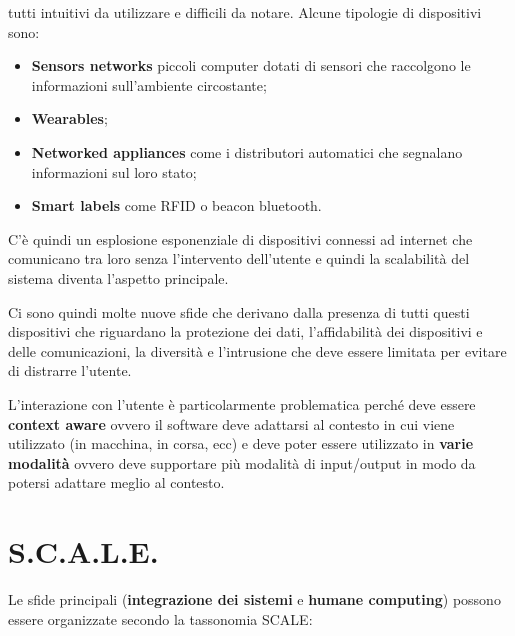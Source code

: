 tutti intuitivi da utilizzare e difficili da notare.
Alcune tipologie di dispositivi sono:

\begin{itemize}
\item \textbf{Sensors networks} piccoli computer dotati di sensori che
  raccolgono le informazioni sull'ambiente circostante;
\item \textbf{Wearables};
\item \textbf{Networked appliances} come i distributori automatici che
  segnalano informazioni sul loro stato;
\item \textbf{Smart labels} come RFID o beacon bluetooth.

\end{itemize}

C'è quindi un esplosione esponenziale di dispositivi connessi ad
internet che comunicano tra loro senza l'intervento dell'utente e
quindi la scalabilità del sistema diventa l'aspetto principale.

Ci sono quindi molte nuove sfide che derivano dalla presenza di tutti
questi dispositivi che riguardano la protezione dei dati, l'affidabilità
dei dispositivi e delle comunicazioni, la diversità e l'intrusione che
deve essere limitata per evitare di distrarre l'utente.

L'interazione con l'utente è particolarmente problematica perché deve
essere \textbf{context aware} ovvero il software deve adattarsi al
contesto in cui viene utilizzato (in macchina, in corsa, ecc) e deve
poter essere utilizzato in \textbf{varie modalità} ovvero deve
supportare più modalità di input/output in modo da potersi adattare
meglio al contesto.

\section{S.C.A.L.E.}
\label{s.c.a.l.e.}

Le sfide principali (\textbf{integrazione dei sistemi} e \textbf{humane
computing}) possono essere organizzate secondo la tassonomia SCALE:

